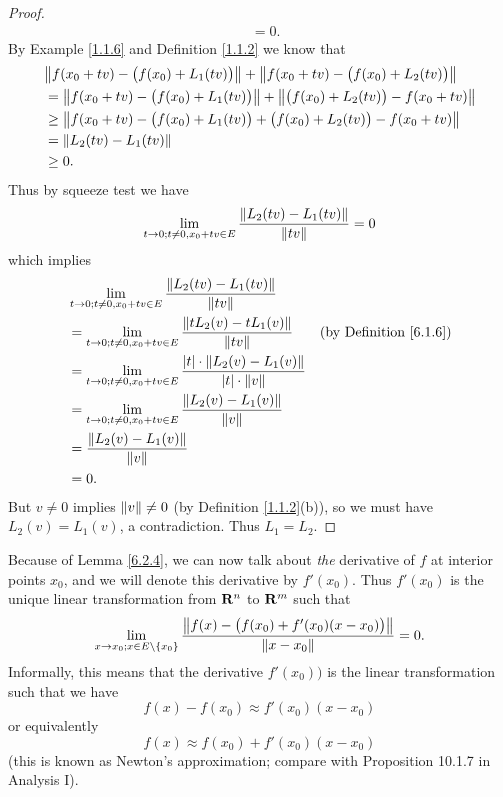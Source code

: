 \begin{proof}
\begin{align*}
         & = 0.
    \end{align*}
    By Example \ref{1.1.6} and Definition \ref{1.1.2} we know that
    \begin{align*}
         & \norm*{f(x_0 + tv) - \big(f(x_0) + L_1(tv)\big)} + \norm*{f(x_0 + tv) - \big(f(x_0) + L_2(tv)\big)}   \\
         & = \norm*{f(x_0 + tv) - \big(f(x_0) + L_1(tv)\big)} + \norm*{\big(f(x_0) + L_2(tv)\big) - f(x_0 + tv)} \\
         & \geq \norm*{f(x_0 + tv) - \big(f(x_0) + L_1(tv)\big) + \big(f(x_0) + L_2(tv)\big) - f(x_0 + tv)}      \\
         & = \norm*{L_2(tv) - L_1(tv)}                                                                           \\
         & \geq 0.
    \end{align*}
    Thus by squeeze test we have
    \[
        \lim_{t \to 0 ; t \neq 0, x_0 + tv \in E} \frac{\norm*{L_2(tv) - L_1(tv)}}{\norm*{tv}} = 0
    \]
    which implies
    \begin{align*}
         & \lim_{t \to 0 ; t \neq 0, x_0 + tv \in E} \frac{\norm*{L_2(tv) - L_1(tv)}}{\norm*{tv}}                                                                 \\
         & = \lim_{t \to 0 ; t \neq 0, x_0 + tv \in E} \frac{\norm*{t L_2(v) - t L_1(v)}}{\norm*{tv}}                        & \text{(by Definition \ref{6.1.6})} \\
         & = \lim_{t \to 0 ; t \neq 0, x_0 + tv \in E} \frac{\abs{t} \cdot \norm*{L_2(v) - L_1(v)}}{\abs{t} \cdot \norm*{v}}                                      \\
         & = \lim_{t \to 0 ; t \neq 0, x_0 + tv \in E} \frac{\norm*{L_2(v) - L_1(v)}}{\norm*{v}}                                                                  \\
         & = \frac{\norm*{L_2(v) - L_1(v)}}{\norm*{v}}                                                                                                            \\
         & = 0.
    \end{align*}
    But \(v \neq 0\) implies \(\norm*{v} \neq 0\) (by Definition \ref{1.1.2}(b)), so we must have \(L_2(v) = L_1(v)\), a contradiction.
    Thus \(L_1 = L_2\).
\end{proof}

\begin{note}
    Because of Lemma \ref{6.2.4}, we can now talk about \emph{the} derivative of \(f\) at interior points \(x_0\), and we will denote this derivative by \(f'(x_0)\).
    Thus \(f'(x_0)\) is the unique linear transformation from \(\R^n\) to \(\R^m\) such that
    \[
        \lim_{x \to x_0 ; x \in E \setminus \{x_0\}} \frac{\norm*{f(x) - \big(f(x_0) + f'(x_0)(x - x_0)\big)}}{\norm*{x - x_0}} = 0.
    \]
    Informally, this means that the derivative \(f'(x_0))\) is the linear transformation such that we have
    \[
        f(x) - f(x_0) \approx f'(x_0)(x - x_0)
    \]
    or equivalently
    \[
        f(x) \approx f(x_0) + f'(x_0)(x - x_0)
    \]
    (this is known as Newton's approximation;
    compare with Proposition 10.1.7 in Analysis I).
\end{note}

